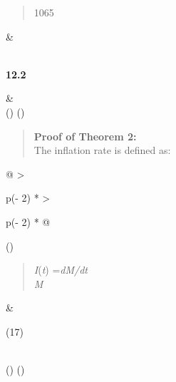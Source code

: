 \documentclass[
]{article}
\begin{document}
\begin{longtable}[]
\begin{minipage}[b]{\linewidth}
\begin{quote}
1065
\end{quote}
\end{minipage} &
 \\
 \\
\begin{minipage}[b]{\linewidth}\raggedright
\textbf{12.2}
\end{minipage} &
 \\
\midrule()
\endhead
\bottomrule()
\end{longtable}

\begin{quote}
\textbf{Proof of Theorem 2:}\\
The inflation rate is defined as:
\end{quote}

\begin{longtable}[]{@{}
  >{\raggedright\arraybackslash}p{(\columnwidth - 2\tabcolsep) * }
  >{\raggedright\arraybackslash}p{(\columnwidth - 2\tabcolsep) * }@{}}
\toprule()
\begin{minipage}[b]{\linewidth}\raggedright
\begin{quote}
\emph{I}(\emph{t}) =\emph{dM/dt}\\
\emph{M}
\end{quote}\strut
\end{minipage} & \begin{minipage}[b]{\linewidth}\raggedright
(17)
\end{minipage} \\
\midrule()
\endhead
\bottomrule()
\end{longtable}
\end{document}
